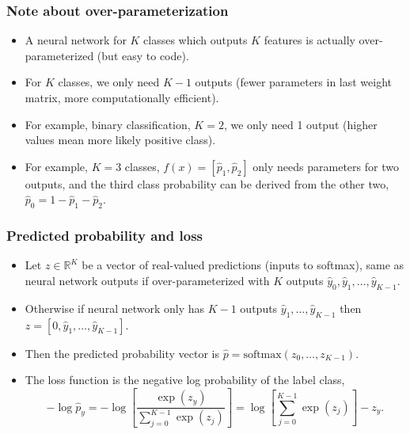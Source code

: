 \message{ !name(06-backprop.tex)}\documentclass{beamer}
\begin{document}
\begin{frame}
  \frametitle{Note about over-parameterization}

  \begin{itemize}
  \item A neural network for $K$ classes which outputs $K$ features is
    actually over-parameterized (but easy to code).
  \item For $K$ classes, we only need $K-1$ outputs (fewer parameters
    in last weight matrix, more computationally efficient).
  \item For example, binary classification, $K=2$, we only need 1
    output (higher values mean more likely positive class).
  \item For example, $K=3$ classes, $f(x)=[\hat p_1,\hat p_2]$ only
    needs parameters for two outputs, and the third class probability
    can be derived from the other two, $\hat p_0=1-\hat p_1-\hat p_2$.
  \end{itemize}
\end{frame}

\begin{frame}
  \frametitle{Predicted probability and loss}

  \begin{itemize}
  \item Let $z\in\mathbb R^K$ be a vector of real-valued predictions
    (inputs to softmax), same as neural network outputs if
    over-parameterized with $K$ outputs
    $\hat y_0, \hat y_1,\dots,\hat y_{K-1}$.
  \item Otherwise if neural network only has $K-1$ outputs
    $\hat y_1,\dots,\hat y_{K-1}$ then
    $z=[0,\hat y_1,\dots,\hat y_{K-1}]$.
  \item Then the predicted probability vector is
    $\hat p=\text{softmax}(z_0,\dots,z_{K-1})$.
  \item The loss function is the negative log probability of the label
    class,
$$ 
-\log \hat p_y = -\log
\left[
\frac{
  \exp(z_y)
}{
  \sum_{j=0}^{K-1}
  \exp(z_j)
}
\right]
=
\log
\left[
\sum_{j=0}^{K-1}  \exp(z_j) 
\right]
-z_y.
$$
  \end{itemize}
  
\end{frame}
\end{document}
